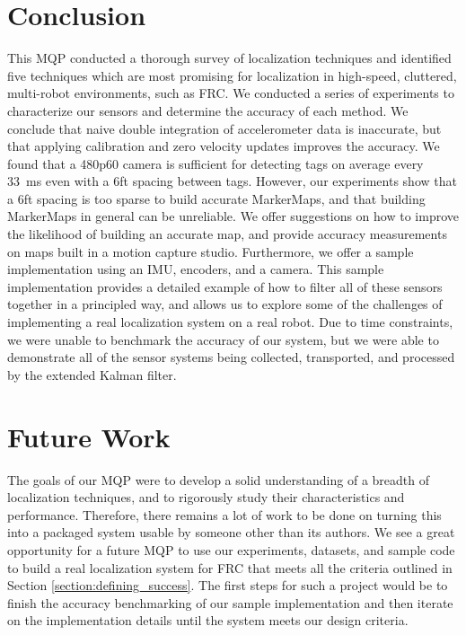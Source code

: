 \documentclass{article}
\begin{document}
\section{Conclusion} \label{section:conclusion}

  This MQP conducted a thorough survey of localization techniques and identified five techniques which are most promising for localization in high-speed, cluttered, multi-robot environments, such as FRC. We conducted a series of experiments to characterize our sensors and determine the accuracy of each method. We conclude that naive double integration of accelerometer data is inaccurate, but that applying calibration and zero velocity updates improves the accuracy. We found that a 480p60 camera is sufficient for detecting tags on average every \SI{33}{\milli\second} even with a 6ft spacing between tags. However, our experiments show that a 6ft spacing is too sparse to build accurate MarkerMaps, and that building MarkerMaps in general can be unreliable. We offer suggestions on how to improve the likelihood of building an accurate map, and provide accuracy measurements on maps built in a motion capture studio. Furthermore, we offer a sample implementation using an IMU, encoders, and a camera. This sample implementation provides a detailed example of how to filter all of these sensors together in a principled way, and allows us to explore some of the challenges of implementing a real localization system on a real robot. Due to time constraints, we were unable to benchmark the accuracy of our system, but we were able to demonstrate all of the sensor systems being collected, transported, and processed by the extended Kalman filter.



\section{Future Work} \label{section:future_work}

  The goals of our MQP were to develop a solid understanding of a breadth of localization techniques, and to rigorously study their characteristics and performance. Therefore, there remains a lot of work to be done on turning this into a packaged system usable by someone other than its authors. We see a great opportunity for a future MQP to use our experiments, datasets, and sample code to build a real localization system for FRC that meets all the criteria outlined in Section \ref{section:defining_success}. The first steps for such a project would be to finish the accuracy benchmarking of our sample implementation and then iterate on the implementation details until the system meets our design criteria.
\end{document}
